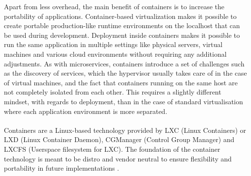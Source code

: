 \noindent
Apart from less overhead, the main benefit of containers is to increase the portability of applications. Container-based virtualization makes it possible to create portable production-like runtime environments on the localhost that can be used during development. Deployment inside containers makes it possible to run the same application in multiple settings like physical servers, virtual machines and various cloud environments without requiring any additional adjustments. As with microservices, containers introduce a set of challenges such as the discovery of services, which the hypervisor usually takes care of in the case of virtual machines, and the fact that containers running on the same host are not completely isolated from each other. This requires a slightly different mindset, with regards to deployment, than in the case of standard virtualisation where each application environment is more separated.
\\ \\
Containers are a Linux-based technology provided by LXC (Linux Containers) or LXD (Linux Container Daemon), CGManager (Control Group Manager) and LXCFS (Userspace filesystem for LXC). The foundation of the container technology is meant to be distro and vendor neutral to ensure flexibility and portability in future implementations \cite{linuxContainers}.


